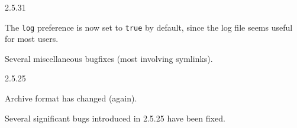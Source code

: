 \begin{changesfromversion}{2.5.31}
\item The \verb|log| preference is now set to \verb|true| by default,
  since the log file seems useful for most users.
\item Several miscellaneous bugfixes (most involving symlinks).
\end{changesfromversion}

\begin{changesfromversion}{2.5.25}
\item \incompatible{} Archive format has changed (again).

\item Several significant bugs introduced in 2.5.25 have been fixed.
\end{changesfromversion}

